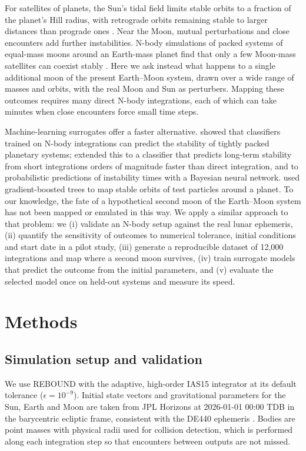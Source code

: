 \documentclass[twocolumn]{aastex631}
\begin{document}
For satellites of planets, the Sun's tidal field limits stable orbits to a fraction of the
planet's Hill radius, with retrograde orbits remaining stable to larger distances than prograde
ones \citep{Domingos2006, Shen2008}. Near the Moon, mutual perturbations and close encounters add
further instabilities. N-body simulations of packed systems of equal-mass moons around an
Earth-mass planet find that only a few Moon-mass satellites can coexist stably
\citep{Satyal2022}. Here we ask instead what happens to a single additional moon of the present
Earth--Moon system, drawn over a wide range of masses and orbits, with the real Moon and Sun as
perturbers. Mapping these outcomes requires many direct N-body integrations, each of which can take
minutes when close encounters force small time steps.

Machine-learning surrogates offer a faster alternative. \citet{Tamayo2016} showed that classifiers
trained on N-body integrations can predict the stability of tightly packed planetary systems;
\citet{Tamayo2020} extended this to a classifier that predicts long-term stability from short
integrations orders of magnitude faster than direct integration, and \citet{Cranmer2021} to
probabilistic predictions of instability times with a Bayesian neural network.
\citet{Pinheiro2025} used gradient-boosted trees to map stable orbits of test particles around a
planet. To our knowledge, the fate of a hypothetical second moon of the Earth--Moon system has not
been mapped or emulated in this way. We apply a similar approach to that problem: we (i) validate
an N-body setup against the real lunar ephemeris, (ii) quantify the sensitivity of outcomes to
numerical tolerance, initial conditions and start date in a pilot study, (iii) generate a
reproducible dataset of 12,000 integrations and map where a second moon survives, (iv) train
surrogate models that predict the outcome from the initial parameters, and (v) evaluate the
selected model once on held-out systems and measure its speed.

\section{Methods} \label{sec:methods}

\subsection{Simulation setup and validation}

We use REBOUND \citep{Rein2012} with the adaptive, high-order IAS15 integrator \citep{Rein2015}
at its default tolerance ($\epsilon = 10^{-9}$). Initial state vectors and gravitational
parameters for the Sun, Earth and Moon are taken from JPL Horizons \citep{Giorgini1996} at
2026-01-01 00:00 TDB in the barycentric ecliptic frame, consistent with the DE440 ephemeris
\citep{Park2021}. Bodies are point masses with physical radii used for collision detection, which
is performed along each integration step so that encounters between outputs are not missed.
\end{document}
